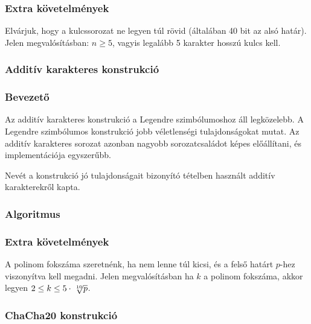 \documentclass[12pt]{article}
\begin{document}
	\subsubsection*{Extra követelmények}
	Elvárjuk, hogy a kulcssorozat ne legyen túl rövid (általában 40 bit az alsó határ). Jelen megvalósításban: $n \geq 5$, vagyis legalább 5 karakter hosszú kulcs kell.
	\subsubsection{Additív karakteres konstrukció}
	\subsubsection*{Bevezető}
	Az additív karakteres konstrukció a Legendre szimbólumoshoz áll legközelebb. A Legendre szimbólumos konstrukció jobb véletlenségi tulajdonságokat mutat. Az additív karakteres sorozat azonban nagyobb sorozatcsaládot képes előállítani, és implementációja egyszerűbb.
	
	Nevét a konstrukció jó tulajdonságait bizonyító tételben használt additív karakterekről kapta.
	\subsubsection*{Algoritmus}
	\subsubsection*{Extra követelmények}
	A polinom fokszáma szeretnénk, ha nem lenne túl kicsi, és a felső határt $p$-hez viszonyítva kell megadni. Jelen megvalósításban ha $k$ a polinom fokszáma, akkor legyen $2 \leq k \leq 5\cdot\sqrt[\leftroot{-2}\uproot{2}10]{p}$.
	\subsubsection{ChaCha20 konstrukció}
\end{document}
